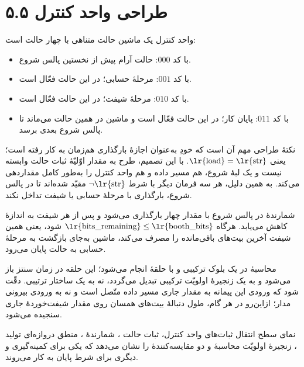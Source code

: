 \documentclass[12pt,a4paper]{article}
\begin{document}

	\section*{۵.۵ طراحی واحد کنترل}
	واحد کنترل یک ماشین حالت متناهی با چهار حالت است:
	\begin{itemize}
		\item {} با کد \(000\): حالت آرام پیش از نخستین پالس شروع.
		\item {} با کد \(001\): مرحلهٔ حسابی؛ در این حالت  فعّال است.
		\item {} با کد \(010\): مرحلهٔ شیفت؛ در این حالت  فعّال است.
		\item {} با کد \(011\): پایان کار؛ در این حالت  فعّال است و ماشین در همین حالت می‌ماند تا پالس شروع بعدی برسد.
	\end{itemize}

	نکتهٔ طراحی مهم آن است که خودِ  به‌عنوان اجازهٔ بارگذاری هم‌زمان به کار رفته است؛ یعنی \(\text{\lr{load}}=\text{\lr{str}}\). با این تصمیم، طرح به مقدار اوّلیّهٔ ثبات حالت وابسته نیست و یک لبهٔ شروع، هم مسیر داده و هم واحد کنترل را به‌طور کامل مقداردهی می‌کند. به همین دلیل، هر سه فرمان دیگر با شرط \(\lnot\text{\lr{str}}\) مقیّد شده‌اند تا در پالس شروع، بارگذاری با مرحلهٔ حسابی یا شیفت تداخل نکند.

	شمارندهٔ  در پالس شروع با مقدار چهار بارگذاری می‌شود و پس از هر شیفت به اندازهٔ  کاهش می‌یابد. هرگاه \(\text{\lr{bits\_remaining}}\leq\text{\lr{booth\_bits}}\) شود، یعنی همین شیفت آخرین بیت‌های باقی‌مانده را مصرف می‌کند، ماشین به‌جای بازگشت به مرحلهٔ حسابی به حالت پایان می‌رود.

	محاسبهٔ  در یک بلوک ترکیبی و با حلقهٔ  انجام می‌شود؛ این حلقه در زمان سنتز باز می‌شود و به یک زنجیرهٔ اولویّت ترکیبی تبدیل می‌گردد، نه به یک ساختار ترتیبی. دقّت شود که ورودی  این پیمانه به مقدار جاری  مسیر داده متّصل است و نه به ورودی بیرونی مدار؛ ازاین‌رو در هر گام، طول دنبالهٔ بیت‌های همسان روی مقدار شیفت‌خوردهٔ جاری سنجیده می‌شود.


	نمای سطح انتقال ثبات‌های واحد کنترل، ثبات حالت ، شمارندهٔ ، منطق دروازه‌ای تولید ، زنجیرهٔ اولویّت محاسبهٔ  و دو مقایسه‌کنندهٔ  را نشان می‌دهد که یکی برای کمینه‌گیری  و دیگری برای شرط پایان به کار می‌روند.
\end{document}
